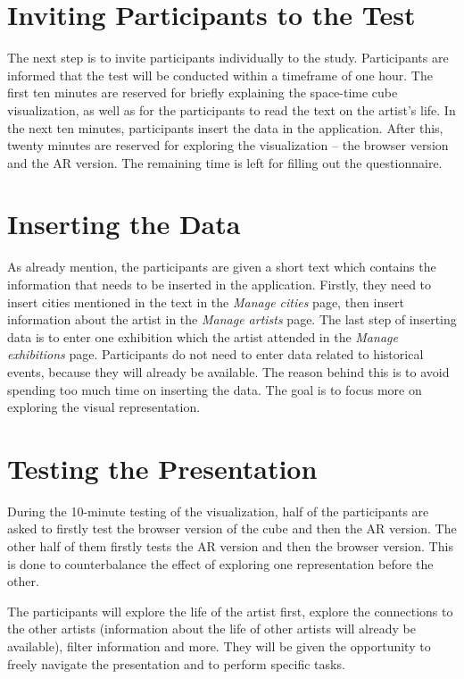 \section{Inviting Participants to the Test}\label{sec:inviting-participants}
The next step is to invite participants individually to the study. Participants are informed that the test will be conducted within a timeframe of
one hour. The first ten minutes are reserved for briefly explaining the space-time cube visualization, as well as for the participants to read the
text on the artist's life. In the next ten minutes, participants insert the data in the application. After this, twenty minutes are reserved for
exploring the visualization -- the browser version and the AR version. The remaining time is left for filling out the questionnaire.

\section{Inserting the Data}\label{sec:inserting-the-data}
As already mention, the participants are given a short text which contains the information that needs to be inserted in the application. Firstly,
they need to insert cities mentioned in the text in the \emph{Manage cities} page, then insert information about the artist in the \emph{Manage
artists} page. The last step of inserting data is to enter one exhibition which the artist attended in the \emph{Manage exhibitions} page.
Participants do not need to enter data related to historical events, because they will already be available. The reason behind this is to avoid
spending too much time on inserting the data. The goal is to focus more on exploring the visual representation.

\section{Testing the Presentation}\label{sec:testing-visualization}
During the 10-minute testing of the visualization, half of the participants are asked to firstly test the browser version of the cube and then
the AR version. The other half of them firstly tests the AR version and then the browser version. This is done to counterbalance the effect of
exploring one representation before the other.

The participants will explore the life of the artist first, explore the connections to the other
artists (information about the life of other artists will already be available), filter information and more. They will be given the opportunity to
freely navigate the presentation and to perform specific tasks.

